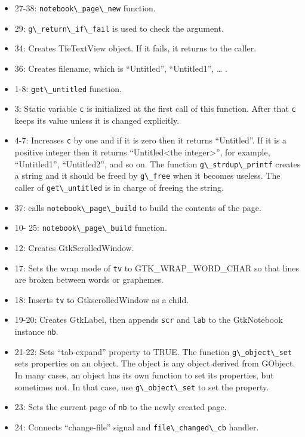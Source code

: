 \begin{itemize}
\tightlist
\item
  27-38: \passthrough{\lstinline!notebook\_page\_new!} function.
\item
  29: \passthrough{\lstinline!g\_return\_if\_fail!} is used to check the
  argument.
\item
  34: Creates TfeTextView object. If it fails, it returns to the caller.
\item
  36: Creates filename, which is ``Untitled'', ``Untitled1'', \ldots{} .
\item
  1-8: \passthrough{\lstinline!get\_untitled!} function.
\item
  3: Static variable \passthrough{\lstinline!c!} is initialized at the
  first call of this function. After that \passthrough{\lstinline!c!}
  keeps its value unless it is changed explicitly.
\item
  4-7: Increases \passthrough{\lstinline!c!} by one and if it is zero
  then it returns ``Untitled''. If it is a positive integer then it
  returns ``Untitled\textless the integer\textgreater{}'', for example,
  ``Untitled1'', ``Untitled2'', and so on. The function
  \passthrough{\lstinline!g\_strdup\_printf!} creates a string and it
  should be freed by \passthrough{\lstinline!g\_free!} when it becomes
  useless. The caller of \passthrough{\lstinline!get\_untitled!} is in
  charge of freeing the string.
\item
  37: calls \passthrough{\lstinline!notebook\_page\_build!} to build the
  contents of the page.
\item
  10- 25: \passthrough{\lstinline!notebook\_page\_build!} function.
\item
  12: Creates GtkScrolledWindow.
\item
  17: Sets the wrap mode of \passthrough{\lstinline!tv!} to
  GTK\_WRAP\_WORD\_CHAR so that lines are broken between words or
  graphemes.
\item
  18: Inserts \passthrough{\lstinline!tv!} to GtkscrolledWindow as a
  child.
\item
  19-20: Creates GtkLabel, then appends \passthrough{\lstinline!scr!}
  and \passthrough{\lstinline!lab!} to the GtkNotebook instance
  \passthrough{\lstinline!nb!}.
\item
  21-22: Sets ``tab-expand'' property to TRUE. The function
  \passthrough{\lstinline!g\_object\_set!} sets properties on an object.
  The object is any object derived from GObject. In many cases, an
  object has its own function to set its properties, but sometimes not.
  In that case, use \passthrough{\lstinline!g\_object\_set!} to set the
  property.
\item
  23: Sets the current page of \passthrough{\lstinline!nb!} to the newly
  created page.
\item
  24: Connects ``change-file'' signal and
  \passthrough{\lstinline!file\_changed\_cb!} handler.
\end{itemize}

